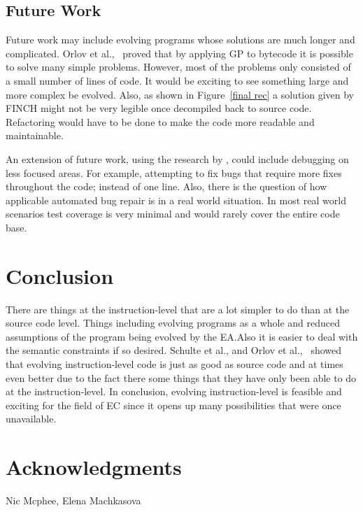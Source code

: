 \documentclass{sig-alternate}
\begin{document}
\subsection{Future Work}


Future work may include evolving programs whose solutions are much longer and complicated. Orlov et al.,~\cite{FINCH:2011} proved that by applying GP to bytecode it is possible to solve many simple problems. However, most of the problems only consisted of a small number of lines of code. It would be exciting to see something large and more complex be evolved. Also, as shown in Figure~\ref{final rec} a solution given by FINCH might not be very legible once decompiled back to source code. Refactoring would have to be done to make the code more readable and maintainable.

An extension of future work, using the research by \cite{Assembly:2010}, could include debugging on less focused areas. For example, attempting to fix bugs that require more fixes throughout the code; instead of one line. Also, there is the question of how applicable automated bug repair is in a real world situation. In most real world scenarios test coverage is very minimal and would rarely cover the entire code base.


\section{Conclusion}
There are things at the instruction-level that are a lot simpler to do than at the source code level. Things including evolving programs as a whole and reduced assumptions of the program being evolved by the EA.Also it is easier to deal with the semantic constraints if so desired. Schulte et al., and Orlov et al.,~\cite{Assembly:2010 FINCH:2011} showed that evolving instruction-level code is just as good as source code and at times even better due to the fact there some things that they have only been able to do at the instruction-level. In conclusion, evolving instruction-level is feasible and exciting for the field of EC since it opens up many possibilities that were once unavailable.

\section{Acknowledgments}
Nic Mcphee, Elena Machkasova

%

%
%
\end{document}
